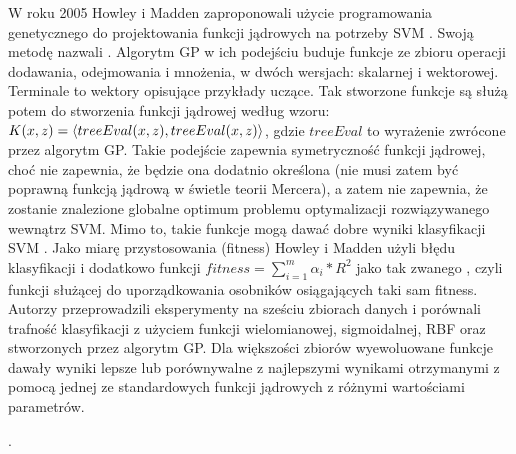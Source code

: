 W roku 2005 Howley i Madden zaproponowali użycie programowania genetycznego do projektowania funkcji jądrowych na potrzeby SVM \cite{howley_genetic_2005}. Swoją metodę nazwali . Algorytm GP w ich podejściu buduje funkcje ze zbioru operacji dodawania, odejmowania i mnożenia, w dwóch wersjach: skalarnej i wektorowej. Terminale to wektory opisujące przykłady uczące. Tak stworzone funkcje są służą potem do stworzenia funkcji jądrowej według wzoru:
$ K(x, z) = \langle treeEval(x, z), treeEval(x, z) \rangle $, gdzie $ treeEval $ to wyrażenie zwrócone przez algorytm GP. Takie podejście zapewnia symetryczność funkcji jądrowej, choć nie zapewnia, że będzie ona dodatnio określona (nie musi zatem być poprawną funkcją jądrową w świetle teorii Mercera), a zatem nie zapewnia, że zostanie znalezione globalne optimum problemu optymalizacji rozwiązywanego wewnątrz SVM. Mimo to, takie funkcje mogą dawać dobre wyniki klasyfikacji SVM \cite{Bahlmann:2002:OHR:851040.856840}. 
Jako miarę przystosowania (fitness) Howley i Madden użyli błędu klasyfikacji i dodatkowo funkcji $ fitness = \sum_{i=1}^m \alpha_i * R^2 $ jako tak zwanego , czyli funkcji służącej do uporządkowania osobników osiągających taki sam fitness.
Autorzy przeprowadzili eksperymenty na sześciu zbiorach danych i porównali trafność klasyfikacji z użyciem funkcji wielomianowej, sigmoidalnej, RBF oraz stworzonych przez algorytm GP. Dla większości zbiorów wyewoluowane funkcje dawały wyniki lepsze lub porównywalne z najlepszymi wynikami otrzymanymi z pomocą jednej ze standardowych funkcji jądrowych z różnymi wartościami parametrów.



\cite{gagne_genetic_2006}

\cite{sullivan_evolving_2007}

\cite{sean_ecj_2010}.

\clearpage